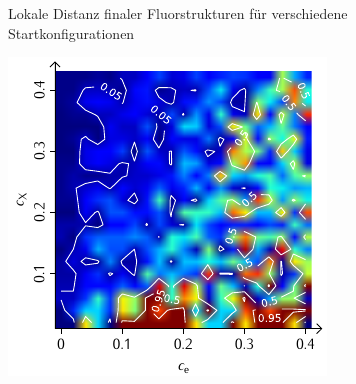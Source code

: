 \documentclass[a4paper, 10pt, twoside, openany]{book} %
\begin{document}
\begin{figure}
\begin{minipage}[t]{0.48\textwidth}
			\label{F_penalty_individual_D}
		\end{minipage}
		\caption[Lokale Distanz finaler Fluorstrukturen]{Lokale Distanz finaler Fluorstrukturen für verschiedene Startkonfigurationen}
		\label{F_D}
	\end{figure}
	
	\begin{figure}
		\begin{minipage}[t]{0.48\textwidth}
			\includegraphics[width=\textwidth]{Abbildungen/Phasendiagramme/Konturen/F_cluster_P.pdf}
			\label{F_cluster_P}
		\end{minipage}
		\hfill
		\begin{minipage}[t]{0.48\textwidth}

\end{minipage}
\end{figure}
\end{document}
